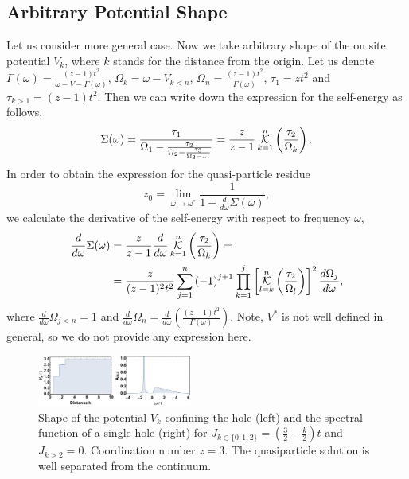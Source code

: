 \documentclass[%
 reprint,
 amsmath,amssymb,
 aps,
prb,
floatfix,
]{revtex4-1}
\newcommand{\K}{\operatornamewithlimits{\mathcal{K}}}
\begin{document}
\subsection{Arbitrary Potential Shape}

Let us consider more general case. Now we take arbitrary shape of the on site potential $V_k$, where $k$ stands for the distance from the origin. Let us denote $\Gamma(\omega) = \frac{(z-1)t^2}{\omega - V - \Gamma(\omega)}$, $\Omega_k = \omega - V_{k<n}$, $\Omega_n = \frac{(z-1)t^2}{\Gamma(\omega)}$, $\tau_1 = zt^2$ and $\tau_{k>1} = (z-1)t^2$. Then we can write down the expression for the self-energy as follows,
\begin{equation}
\begin{aligned}
\Sigma(\omega) = \frac{\tau_1}{\Omega_1 - \frac{\tau_2}{\Omega_2 - \frac{\tau_3}{\Omega_3 - \hdots}}} = \frac{z}{z-1}\K_{k=1}^n \left(\frac{\tau_2}{\Omega_k}\right).
\end{aligned}
\end{equation}
In order to obtain the expression for the quasi-particle residue 
\begin{equation}
z_0 = \lim_{\omega\to\omega^*}\frac{1}{1-\frac{d}{d\omega}\Sigma(\omega)},
\end{equation}
we calculate the derivative of the self-energy with respect to frequency $\omega$,
\begin{equation}
\begin{aligned}
\frac{d}{d\omega} \Sigma(\omega) &= \frac{z}{z-1} \frac{d}{d\omega} \K_{k=1}^n \left(\frac{\tau_2}{\Omega_k}\right) = \\
&= \frac{z}{(z-1)^2t^2}\sum_{j=1}^n \left(-1 \right)^{j+1} \prod_{k=1}^j \left[ \K_{l=k}^n \left(\frac{\tau_2}{\Omega_l}\right) \right]^2 \frac{d\Omega_j}{d\omega},
\end{aligned}
\end{equation}
where $\frac{d}{d\omega}\Omega_{j<n} = 1$ and $\frac{d}{d\omega}\Omega_n = \frac{d}{d\omega}\left( \frac{(z-1)t^2}{\Gamma(\omega)} \right)$. Note, $V^*$ is not well defined in general, so we do not provide any expression here.
~~
\begin{figure}[ht!]
\centering
\includegraphics[width=0.45\textwidth]{anypot}
\caption{Shape of the potential $V_k$ confining the hole (left) and the spectral function of a single hole (right) for $J_{k \in \{0,1,2\}} = (\frac{3}{2}-\frac{k}{2})t$ and $J_{k>2} = 0$. Coordination number $z = 3$. The quasiparticle solution is well separated from the continuum.}
\end{figure}
\end{document}
